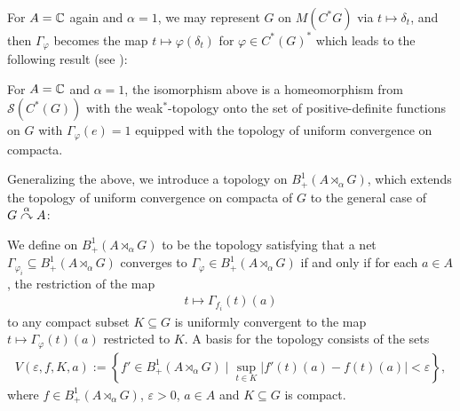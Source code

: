 For $A = \mathbb{C}$ again and $\alpha = 1$, we may represent $G$ on $M(C^*G)$ via $t \mapsto \delta_t$, and then $\Gamma_\varphi$ becomes the map $t \mapsto \varphi(\delta_t)$ for $ \varphi \in C^*(G)^*$ which leads to the following result (see \cite[7.1.11]{pedersenalgauto}):
\begin{proposition}
For $A= \mathbb{C}$ and $\alpha = 1$, the isomorphism above is a homeomorphism from $\mathcal{S}(C^*(G))$ with the weak$^*$-topology onto the set of positive-definite functions on $G$ with $\Gamma_\varphi(e)=1$ equipped with the topology of uniform convergence on compacta.
\label{mult:OGstatehomeo}
\end{proposition}

Generalizing the above, we introduce a topology on $B_+^1(A \rtimes_\alpha G)$, which extends the topology of uniform convergence on compacta of $G$ to the general case of $G \stackrel{\alpha}{\curvearrowright} A$:
\begin{definition}
We define  on $B_+^1(A \rtimes_\alpha G)$ to be the topology satisfying that a net $\Gamma_{\varphi_i} \subseteq B_+^1(A \rtimes_\alpha G)$ converges to $\Gamma_{\varphi} \in B_+^1(A \rtimes_\alpha G)$ if and only if for each $a \in A$, the restriction of the map
\begin{align*}
	t \mapsto \Gamma_{f_i}(t)(a)
\end{align*}
to any compact subset $K \subseteq G$ is uniformly convergent to the map $t \mapsto \Gamma_\varphi(t)(a)$ restricted to $K$. A basis for the topology consists of the sets
\begin{align*}
	V(\varepsilon, f, K, a) :=\left\{ f' \in B_+^1(A \rtimes_\alpha G) \mid \sup_{t \in K}| f'(t)(a) - f(t)(a) | < \varepsilon \right\},
\end{align*}
where $f \in B_{+}^1(A \rtimes_\alpha G)$, $\varepsilon > 0$, $a \in A$ and $K \subseteq G$ is compact.
\end{definition}

